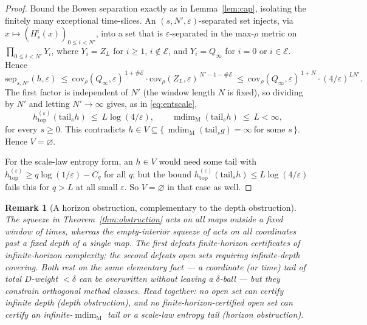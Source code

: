\documentclass[11pt]{article}
\newtheorem{remark}[theorem]{Remark}
\newcommand{\Q}{Q_\infty}
\newcommand{\mdim}{\operatorname{mdim}_{\mathrm M}}
\begin{document}
\begin{proof}
Bound the Bowen separation exactly as in Lemma~\ref{lem:cap}, isolating the finitely
many exceptional time-slices.  An $(s,N',\varepsilon)$-separated set injects, via
$x\mapsto(H^i_s(x))_{0\le i<N'}$, into a set that is $\varepsilon$-separated in the
max-$\rho$ metric on $\prod_{0\le i<N'}Y_i$, where $Y_i=Z_L$ for $i\ge1$, $i\notin\mathcal E$,
and $Y_i=\Q$ for $i=0$ or $i\in\mathcal E$.  Hence
\[
\mathrm{sep}_{s,N'}(h,\varepsilon)\ \le\ \mathrm{cov}_\rho(\Q,\varepsilon)^{\,1+\#\mathcal E}\cdot
\mathrm{cov}_\rho(Z_L,\varepsilon)^{\,N'-1-\#\mathcal E}
\ \le\ \mathrm{cov}_\rho(\Q,\varepsilon)^{\,1+N}\cdot(4/\varepsilon)^{L N'} .
\]
The first factor is independent of $N'$ (the window length $N$ is fixed), so dividing by
$N'$ and letting $N'\to\infty$ gives, as in \eqref{eq:entscale},
\[
h^{(\varepsilon)}_{\mathrm{top}}(\mathrm{tail}_sh)\ \le\ L\log(4/\varepsilon),
\qquad
\mdim(\mathrm{tail}_sh)\ \le\ L<\infty,
\]
for every $s\ge0$.  This contradicts
$h\in V\subseteq\{\,\mdim(\mathrm{tail}_sg)=\infty\ \text{for some }s\,\}$.  Hence
$V=\varnothing$.

For the scale-law entropy form, an $h\in V$ would need some tail with
$h^{(\varepsilon)}_{\mathrm{top}}\ge q\log(1/\varepsilon)-C_q$ for all $q$; but the bound
$h^{(\varepsilon)}_{\mathrm{top}}(\mathrm{tail}_sh)\le L\log(4/\varepsilon)$ fails this
for $q>L$ at all small $\varepsilon$.  So $V=\varnothing$ in that case as well.
\end{proof}

\begin{remark}[A horizon obstruction, complementary to the depth obstruction]\label{rem:horizon}
The squeeze in Theorem~\ref{thm:obstruction} acts on all maps \emph{outside a fixed
window of times}, whereas the empty-interior squeeze of \cite[Theorem~6.2]{companion}
acts on all coordinates \emph{past a fixed depth} of a single map.  The first defeats
finite-\emph{horizon} certificates of infinite-horizon complexity; the second defeats
open sets requiring infinite-\emph{depth} covering.  Both rest on the same elementary
fact --- a coordinate (or time) tail of total $D$-weight $<\delta$ can be overwritten
without leaving a $\delta$-ball --- but they constrain orthogonal method classes.  Read
together: no open set can certify infinite depth (depth obstruction), and no
finite-horizon-certified open set can certify an infinite-\(\mdim\) tail or a scale-law
entropy tail (horizon obstruction).
\end{remark}
\end{document}
